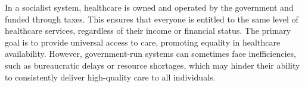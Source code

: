 \par
In a socialist system, healthcare is owned and operated by the government and funded through taxes. This ensures that everyone is entitled to the same level of healthcare services, regardless of their income or financial status. The primary goal is to provide universal access to care, promoting equality in healthcare availability. However, government-run systems can sometimes face inefficiencies, such as bureaucratic delays or resource shortages, which may hinder their ability to consistently deliver high-quality care to all individuals.